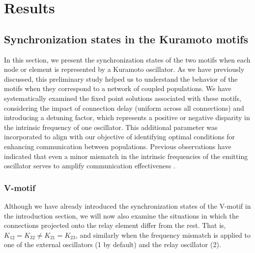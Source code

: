 \documentclass[../main.tex]{subfiles}
\begin{document}
\section{Results}
\subsection{Synchronization states in the Kuramoto motifs}
In this section, we present the synchronization states of the two motifs when each node or element is represented by a Kuramoto oscillator.
As we have previously discussed, this preliminary study helped us to understand the behavior of the motifs when they correspond to a network of coupled populations.
We have systematically examined the fixed point solutions associated with these motifs, considering the impact of connection delay (uniform across all connections) and introducing a detuning factor, which represents a positive or negative disparity in the intrinsic frequency of one oscillator.
This additional parameter was incorporated to align with our objective of identifying optimal conditions for enhancing communication between populations. Previous observations have indicated that even a minor mismatch in the intrinsic frequencies of the emitting oscillator serves to amplify communication effectiveness \citep{kirst_dynamic_2016,pariz_high_2018,pariz_transmission_2021}.

\subsubsection{V-motif}
Although we have already introduced the synchronization states of the V-motif in the introduction section, we will now also examine the situations in which the connections projected onto the relay element differ from the rest.
That is, $K_{12} = K_{32} \neq K_{21} = K_{23}$, and similarly when the frequency mismatch is applied to one of the external oscillators (1 by default) and the relay oscillator (2).
\end{document}
